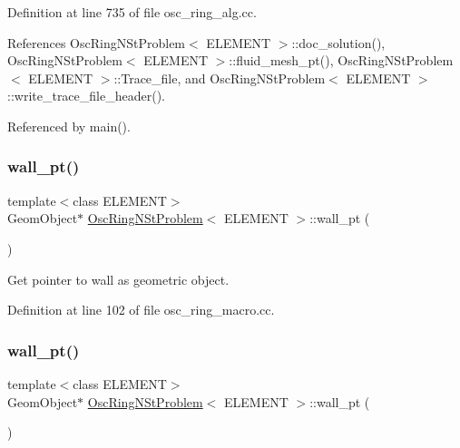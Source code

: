 Definition at line 735 of file osc\+\_\+ring\+\_\+alg.\+cc.



References Osc\+Ring\+N\+St\+Problem$<$ E\+L\+E\+M\+E\+N\+T $>$\+::doc\+\_\+solution(), Osc\+Ring\+N\+St\+Problem$<$ E\+L\+E\+M\+E\+N\+T $>$\+::fluid\+\_\+mesh\+\_\+pt(), Osc\+Ring\+N\+St\+Problem$<$ E\+L\+E\+M\+E\+N\+T $>$\+::\+Trace\+\_\+file, and Osc\+Ring\+N\+St\+Problem$<$ E\+L\+E\+M\+E\+N\+T $>$\+::write\+\_\+trace\+\_\+file\+\_\+header().



Referenced by main().

\mbox{\label{classOscRingNStProblem_a8ef3175a1869d5d2f788c68e1c090538}} 
\subsubsection{\texorpdfstring{wall\+\_\+pt()}{wall\_pt()}\hspace{0.1cm}{\footnotesize\ttfamily [1/2]}}
{\footnotesize\ttfamily template$<$class E\+L\+E\+M\+E\+NT$>$ \\
Geom\+Object$\ast$ \hyperlink{classOscRingNStProblem}{Osc\+Ring\+N\+St\+Problem}$<$ E\+L\+E\+M\+E\+NT $>$\+::wall\+\_\+pt (\begin{DoxyParamCaption}{ }\end{DoxyParamCaption})\hspace{0.3cm}{\ttfamily [inline]}}



Get pointer to wall as geometric object. 



Definition at line 102 of file osc\+\_\+ring\+\_\+macro.\+cc.

\mbox{\label{classOscRingNStProblem_a8ef3175a1869d5d2f788c68e1c090538}} 
\subsubsection{\texorpdfstring{wall\+\_\+pt()}{wall\_pt()}\hspace{0.1cm}{\footnotesize\ttfamily [2/2]}}
{\footnotesize\ttfamily template$<$class E\+L\+E\+M\+E\+NT$>$ \\
Geom\+Object$\ast$ \hyperlink{classOscRingNStProblem}{Osc\+Ring\+N\+St\+Problem}$<$ E\+L\+E\+M\+E\+NT $>$\+::wall\+\_\+pt (\begin{DoxyParamCaption}{ }\end{DoxyParamCaption})\hspace{0.3cm}{\ttfamily [inline]}}



